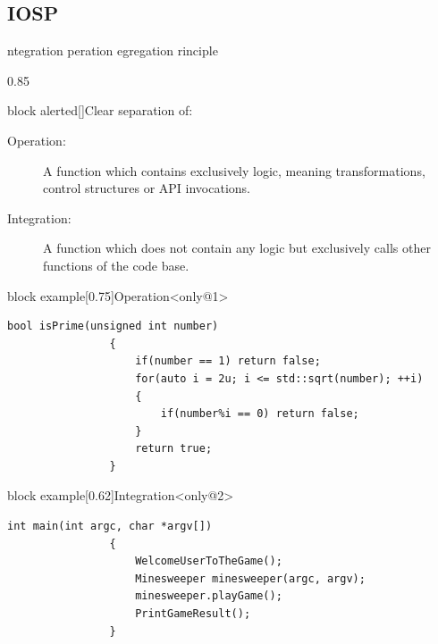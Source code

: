 \subsection{IOSP}
\begin{frame}[fragile]{ntegration peration egregation rinciple}
    \begin{overlayarea}{\textwidth}{0.85\textheight}
        \vspace{-3mm}
        \begin{varblock}{block alerted}[\textwidth]{Clear separation of:}
            \begin{description}
                \item[Operation:]   A function which contains exclusively logic, meaning transformations, control structures or API invocations.
                \item[Integration:] A function which does not contain any logic but exclusively calls other functions of the code base.
            \end{description}
        \end{varblock}
        \vspace{-1mm}
        \begin{varblock}{block example}[0.75\textwidth]{Operation}<only@1>
            \begin{lstlisting}[style=MyCpp]
                bool isPrime(unsigned int number)
                {
                    if(number == 1) return false;
                    for(auto i = 2u; i <= std::sqrt(number); ++i)
                    {
                        if(number%i == 0) return false;
                    }
                    return true;
                }
            \end{lstlisting}
        \end{varblock}
        \begin{varblock}{block example}[0.62\textwidth]{Integration}<only@2>
            \begin{lstlisting}[style=MyCpp]
                int main(int argc, char *argv[])
                {
                    WelcomeUserToTheGame();
                    Minesweeper minesweeper(argc, argv);
                    minesweeper.playGame();
                    PrintGameResult();
                }
            \end{lstlisting}
        \end{varblock}
    \end{overlayarea}
\end{frame}
